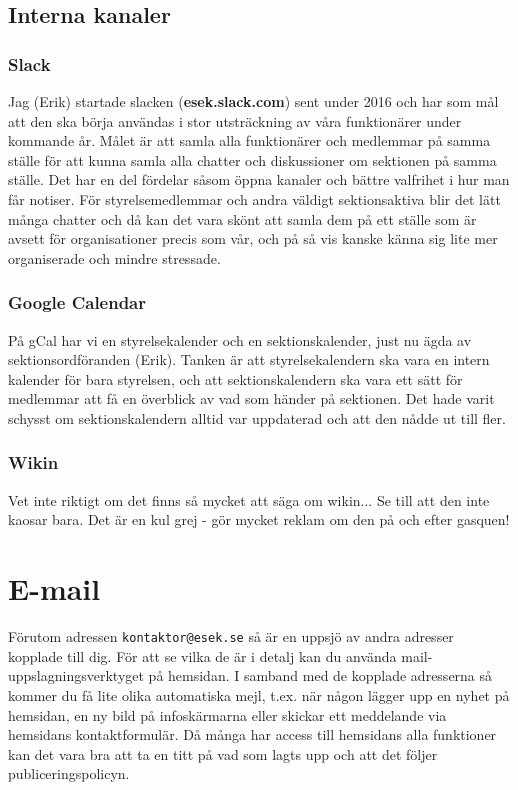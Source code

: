 \documentclass[10pt]{article}
\begin{document}
\subsection{Interna kanaler}
\subsubsection{Slack}
Jag (Erik) startade slacken (\textbf{esek.slack.com}) sent under 2016 och har som mål att den ska börja användas i stor utsträckning av våra funktionärer under kommande år. Målet är att samla alla funktionärer och medlemmar på samma ställe för att kunna samla alla chatter och diskussioner om sektionen på samma ställe. Det har en del fördelar såsom öppna kanaler och bättre valfrihet i hur man får notiser. För styrelsemedlemmar och andra väldigt sektionsaktiva blir det lätt många chatter och då kan det vara skönt att samla dem på ett ställe som är avsett för organisationer precis som vår, och på så vis kanske känna sig lite mer organiserade och mindre stressade.

\subsubsection{Google Calendar}
På gCal har vi en styrelsekalender och en sektionskalender, just nu ägda av sektionsordföranden (Erik). Tanken är att styrelsekalendern ska vara en intern kalender för bara styrelsen, och att sektionskalendern ska vara ett sätt för medlemmar att få en överblick av vad som händer på sektionen. Det hade varit schysst om sektionskalendern alltid var uppdaterad och att den nådde ut till fler.

\subsubsection{Wikin}
Vet inte riktigt om det finns så mycket att säga om wikin... Se till att den inte kaosar bara. Det är en kul grej - gör mycket reklam om den på och efter gasquen!

\section{E-mail}
Förutom adressen \texttt{kontaktor@esek.se} så är en uppsjö av andra adresser kopplade till dig. För att se vilka de är i detalj kan du använda mail-uppslagningsverktyget på hemsidan. I samband med de kopplade adresserna så kommer du få lite olika automatiska mejl, t.ex. när någon lägger upp en nyhet på hemsidan, en ny bild på infoskärmarna eller skickar ett meddelande via hemsidans kontaktformulär. Då många har access till hemsidans alla funktioner kan det vara bra att ta en titt på vad som lagts upp och att det följer publiceringspolicyn.
\end{document}
